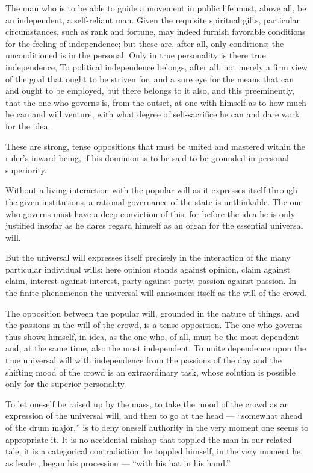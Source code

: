 \documentclass[12pt,a4paper]{book}
\begin{document}
The man who is to be able to guide a movement in public life must, above all, be an independent, a self-reliant man. Given the requisite spiritual gifts, particular circumstances, such as rank and fortune, may indeed furnish favorable conditions for the feeling of independence; but these are, after all, only conditions; the unconditioned is in the personal. Only in true personality is there true independence,
To political independence belongs, after all, not merely a firm view of the goal that ought to be striven for, and a sure eye for the means that can and ought to be employed, but there belongs to it also, and this preeminently, that the one who governs is, from the outset, at one with himself as to how much he can and will venture, with what degree of self-sacrifice he can and dare work for the idea.

These are strong, tense oppositions that must be united and mastered within the ruler's inward being, if his dominion is to be said to be grounded in personal superiority.

Without a living interaction with the popular will as it expresses itself through the given institutions, a rational governance of the state is unthinkable. The one who governs must have a deep
conviction of this; for before the idea he is only justified insofar as he dares regard himself as an organ for the essential universal will.

But the universal will expresses itself precisely in the interaction of the many particular individual wills: here opinion stands against opinion, claim against claim, interest against interest, party against party, passion against passion. In the finite phenomenon the universal will announces itself as the will of the crowd.

The opposition between the popular will, grounded in the nature of things, and the passions in the will of the crowd, is a tense opposition. The one who governs thus shows himself, in idea, as the one who, of all, must be the most dependent and, at the same time, also the most independent. To unite dependence upon the true universal will with independence from the passions of the day and the shifting mood of the crowd is an extraordinary task, whose solution is possible only for the superior personality.

To let oneself be raised up by the mass, to take the mood of the crowd as an expression of the universal will, and then to go at the head --- ``somewhat ahead of the drum major,'' is to deny oneself authority in the very moment one seems to appropriate it. It is no accidental mishap that toppled the man in our related tale; it is a categorical contradiction: he toppled himself, in the very moment he, as leader, began his procession --- ``with his hat in his hand.''
\end{document}
